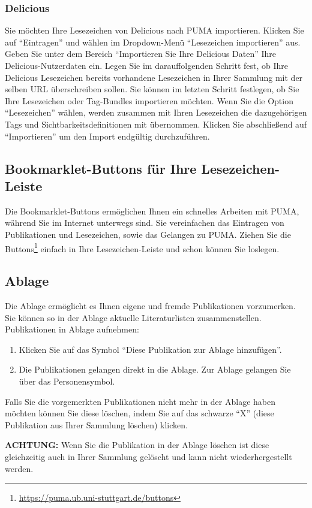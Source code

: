 \documentclass[b5paper,11pt,twoside]{scrbook} %
\begin{document}
\subsubsection{Delicious}
Sie möchten Ihre Lesezeichen von Delicious nach PUMA importieren. Klicken Sie auf \enquote{Eintragen} und wählen im Dropdown-Menü \enquote{Lesezeichen importieren} aus. Geben Sie unter dem Bereich \enquote{Importieren Sie Ihre Delicious Daten} Ihre Delicious-Nutzerdaten ein. \newline
Legen Sie im darauffolgenden Schritt fest, ob Ihre Delicious Lesezeichen bereits vorhandene Lesezeichen in Ihrer Sammlung mit der selben URL überschreiben sollen.\newline
Sie können im letzten Schritt festlegen, ob Sie Ihre Lesezeichen oder Tag-Bundles importieren möchten. Wenn Sie die Option \enquote{Lesezeichen} wählen, werden zusammen mit Ihren Lesezeichen die dazugehörigen Tags und Sichtbarkeitsdefinitionen mit übernommen.
\newline Klicken Sie abschließend auf \enquote{Importieren} um den Import endgültig durchzuführen.
  
\subsection{Bookmarklet-Buttons für Ihre Lesezeichen-Leiste}
Die Bookmarklet-Buttons ermöglichen Ihnen ein schnelles Arbeiten mit PUMA, während Sie im Internet unterwegs sind. Sie vereinfachen das Eintragen von Publikationen und Lesezeichen, sowie das Gelangen zu PUMA. Ziehen Sie die Buttons\footnote{\url{https://puma.ub.uni-stuttgart.de/buttons}} einfach in Ihre Lesezeichen-Leiste und schon können Sie loslegen.

\hypertarget{Ablage}{\subsection{Ablage}}
Die Ablage ermöglicht es Ihnen eigene und fremde Publikationen vorzumerken. Sie können so in der Ablage aktuelle Literaturlisten zusammenstellen.
\newline
Publikationen in Ablage aufnehmen: %
\begin{enumerate}
    \item Klicken Sie auf das Symbol \enquote{Diese Publikation zur Ablage hinzufügen}.
    \item Die Publikationen gelangen direkt in die Ablage. Zur Ablage gelangen Sie über das Personensymbol.
\end{enumerate}
Falls Sie die vorgemerkten Publikationen nicht mehr in der Ablage haben möchten können Sie diese löschen, indem Sie auf das schwarze \enquote{X} (diese Publikation aus Ihrer Sammlung löschen) klicken.
\begin{shaded}
\centering \textbf{ACHTUNG:} Wenn Sie die Publikation in der Ablage löschen ist diese gleichzeitig auch in Ihrer Sammlung gelöscht und kann nicht wiederhergestellt werden.
\end{shaded} 
\end{document}
